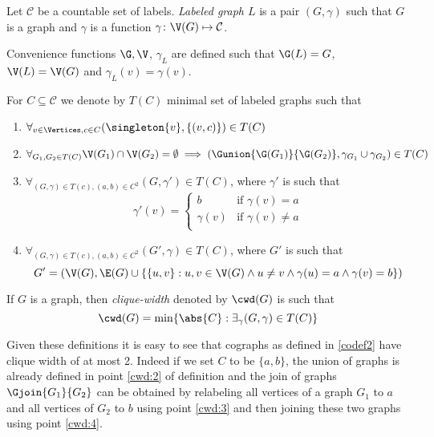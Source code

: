 \begin{defi}
    Let $\mathcal{C}$ be a countable set of labels. \emph{Labeled graph $L$} is a pair $(G, \gamma)$ such that $G$ is a graph and $\gamma$ is a function $\gamma \colon \V(G) \mapsto \mathcal{C}$.

    Convenience functions $\G, \V$, $\gamma_L$ are defined such that $\G(L) = G$, $\V(L) = \V(G)$ and $\gamma_L(v) = \gamma(v)$.
\end{defi}
\begin{defi}
    For $C \subseteq \mathcal{C}$ we denote by $T(C)$ minimal set of labeled graphs such that
    \begin{enumerate}
        \item $\forall_{v \in \Vertices, c \in C} (\singleton{v}, \{(v,c)\}) \in T(C)$
        \item $\forall_{G_1, G_2 \in T(C)} \V(G_1) \cap \V(G_2) = \emptyset \implies (\Gunion{\G(G_1)}{\G(G_2)}, \gamma_{G_1} \cup \gamma_{G_2}) \in T(C)$ \label{cwd:2}
        \item $\forall_{(G, \gamma) \in T(c), (a,b) \in C^2} (G, \gamma') \in T(C)$, where $\gamma'$ is such that
              \[
                  \gamma'(v) = \begin{cases}
                      b         & \text{if } \gamma(v) = a    \\
                      \gamma(v) & \text{if } \gamma(v) \neq a \\
                  \end{cases}
              \] \label{cwd:3}
        \item $\forall_{(G, \gamma) \in T(c), (a,b) \in C^2} (G', \gamma) \in T(C)$, where $G'$ is such that
              \[
                  G' = (\V(G), \E(G) \cup \{\{u, v\}: u,v\in\V(G) \land u \neq v\land \gamma(u) = a \land \gamma(v) = b\})
              \] \label{cwd:4}
    \end{enumerate}
\end{defi}
\begin{defi}
    If $G$ is a graph, then \emph{clique-width} denoted by $\cwd(G)$ is such that
    \[
        \cwd(G) = \min\{\abs{C} : \exists_\gamma (G, \gamma) \in T(C)\}
    \]
\end{defi}

Given these definitions it is easy to see that cographs as defined in \ref{codef2} have clique width of at most 2. Indeed if we set $C$ to be $\{a,b\}$, the union of graphs is already defined in point \ref{cwd:2} of definition and the join of graphs $\Gjoin{G_1}{G_2}$ can be obtained by relabeling all vertices of a graph $G_1$ to $a$ and all vertices of  $G_2$ to $b$ using point \ref{cwd:3} and then joining these two graphs using point \ref{cwd:4}.

